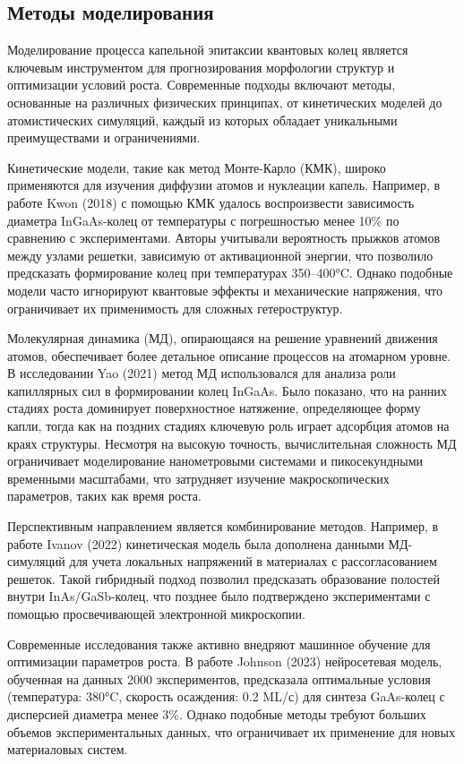 \documentclass[14pt,oneside]{extarticle}
\begin{document}
\subsection{Методы моделирования}

Моделирование процесса капельной эпитаксии квантовых колец является ключевым инструментом для прогнозирования морфологии структур и оптимизации условий роста. Современные подходы включают методы, основанные на различных физических принципах, от кинетических моделей до атомистических симуляций, каждый из которых обладает уникальными преимуществами и ограничениями.

Кинетические модели, такие как метод Монте-Карло (КМК), широко применяются для изучения диффузии атомов и нуклеации капель. Например, в работе Kwon (2018) 
с помощью КМК удалось воспроизвести зависимость диаметра InGaAs-колец от температуры с погрешностью менее 10\% по сравнению с экспериментами. Авторы учитывали вероятность прыжков атомов между узлами решетки, зависимую от активационной энергии, что позволило предсказать формирование колец при температурах 350–400°C. Однако подобные модели часто игнорируют квантовые эффекты и механические напряжения, что ограничивает их применимость для сложных гетероструктур.

Молекулярная динамика (МД), опирающаяся на решение уравнений движения атомов, обеспечивает более детальное описание процессов на атомарном уровне. В исследовании Yao (2021) 
метод МД использовался для анализа роли капиллярных сил в формировании колец InGaAs. Было показано, что на ранних стадиях роста доминирует поверхностное натяжение, определяющее форму капли, тогда как на поздних стадиях ключевую роль играет адсорбция атомов на краях структуры. Несмотря на высокую точность, вычислительная сложность МД ограничивает моделирование нанометровыми системами и пикосекундными временными масштабами, что затрудняет изучение макроскопических параметров, таких как время роста.

Перспективным направлением является комбинирование методов. Например, в работе Ivanov (2022) 
кинетическая модель была дополнена данными МД-симуляций для учета локальных напряжений в материалах с рассогласованием решеток. Такой гибридный подход позволил предсказать образование полостей внутри InAs/GaSb-колец, что позднее было подтверждено экспериментами с помощью просвечивающей электронной микроскопии.

Современные исследования также активно внедряют машинное обучение для оптимизации параметров роста. В работе Johnson (2023) 
нейросетевая модель, обученная на данных 2000 экспериментов, предсказала оптимальные условия (температура: 380°C, скорость осаждения: 0.2 ML/с) для синтеза GaAs-колец с дисперсией диаметра менее 3\%. Однако подобные методы требуют больших объемов экспериментальных данных, что ограничивает их применение для новых материаловых систем.
\end{document}
